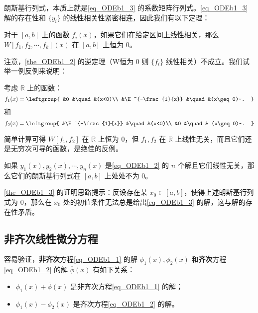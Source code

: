 朗斯基行列式，本质上就是\autoref{eq_ODEb1_3} 的系数矩阵行列式。\autoref{eq_ODEb1_3} 解的存在性和 $\{y_i\}$ 的线性相关性紧密相连，因此我们有以下定理：




\begin{theorem}{}\label{the_ODEb1_2}
对于 $[a, b]$ 上的函数 $f_i(x)$，如果它们在给定区间上线性相关，那么 $W[f_1, f_2, \cdots, f_k](x)$ 在 $[a, b]$ 上恒为 $0$。
\end{theorem}

注意，\autoref{the_ODEb1_2} 的逆定理（W恒为 $0$ 则 $\{f_i\}$ 线性相关）不成立。我们试举一例反例来说明：

\begin{example}{}
考虑 $\mathbb{R}$ 上的函数：
\begin{equation}
f_1(x)=\leftgroup{
    &0 &\quad &(x<0)\\
    &\E^{-\frac{1}{x}} &\quad &(x\geq 0)~.
}
\end{equation}
和
\begin{equation}
f_2(x)=\leftgroup{
    &\E^{-\frac{1}{x}} &\quad&(x<0)\\
    &0 &\quad& (x\geq 0)~.
}
\end{equation}

简单计算可得 $W[f_1, f_2]$ 在 $\mathbb{R}$ 上恒为 $0$，但 $f_1, f_2$ 在 $\mathbb{R}$ 上线性无关，而且它们还是无穷次可导的函数，是绝佳的反例。




\end{example}

\begin{theorem}{}\label{the_ODEb1_3}
如果 $y_1(x), y_2(x), \cdots, y_n(x)$ 是\autoref{eq_ODEb1_2} 的 $n$ 个解且它们线性无关，那么它们的朗斯基行列式在 $[a, b]$ 上处处不为 $0$。
\end{theorem}

\autoref{the_ODEb1_3} 的证明思路提示：反设存在某 $x_0\in[a, b]$，使得上述朗斯基行列式为 $0$，那么在 $x_0$ 处的初值条件无法总是给出\autoref{eq_ODEb1_3} 的解，这与解的存在性矛盾。




\subsection{非齐次线性微分方程}

容易验证，\textbf{非齐次}方程\autoref{eq_ODEb1_1} 的解 ${\phi}_1(x), \phi_2(x)$ 和\textbf{齐次}方程\autoref{eq_ODEb1_2} 的解 $\overline{\phi}(x)$ 有如下关系：
\begin{itemize}
\item $\phi_1(x)+\overline{\phi}(x)$ 是非齐次方程\autoref{eq_ODEb1_1} 的解；
\item $\phi_1(x)-\phi_2(x)$ 是齐次方程\autoref{eq_ODEb1_2} 的解。
\end{itemize}

